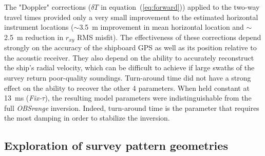 The "Doppler" corrections ($\delta T$ in equation~(\ref{eq:forward})) applied to the two-way travel times provided only a very small improvement to the estimated horizontal instrument locations ($\sim$3.5~m improvement in mean horizontal location and $\sim$2.5~m reduction in $r_{xy}$ RMS misfit). The effectiveness of these corrections depend strongly on the accuracy of the shipboard GPS as well as its position relative to the acoustic receiver. They also depend on the ability to accurately reconstruct the ship's radial velocity, which can be difficult to achieve if large swaths of the survey return poor-quality soundings. Turn-around time did not have a strong effect on the ability to recover the other 4 parameters. When held constant at 13~ms (\textit{Fix-$\tau$}), the resulting model parameters were indistinguishable from the full \textit{OBSrange} inversion. Indeed, turn-around time is the parameter that requires the most damping in order to stabilize the inversion.


\subsection{Exploration of survey pattern geometries} \label{sec:surv_geom_tests}
